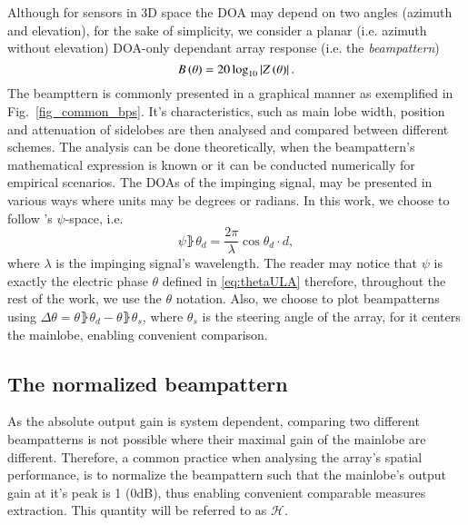 Although for sensors in 3D space the DOA may depend on two angles (azimuth and elevation), for the sake of simplicity, we consider a planar (i.e. azimuth without elevation) DOA-only dependant array response (i.e. the \emph{beampattern})
\begin{equation}
B\left({\theta}\right) = 20\log_{10}\left\vert Z\left({\theta}\right)\right\vert.
\end{equation}
The beampttern is commonly presented in a graphical manner as exemplified in Fig.~\ref{fig_common_bps}.
It's characteristics, such as main lobe width, position and attenuation of sidelobes are then analysed and compared between different schemes.
The analysis can be done theoretically, when the beampattern's mathematical expression is known or it can be conducted numerically for empirical scenarios.
The DOAs of the impinging signal, may be presented in various ways where units may be degrees or radians.
In this work, we choose to follow \cite{van2004optimum}'s $\psi$-space, i.e.
\begin{equation}
    \psi\rBrace{\theta_{d}}=\frac{2\pi}{\lambda}\cos{\theta_{d}}\cdot{}d,
\end{equation}
where $\lambda$ is the impinging signal's wavelength.
The reader may notice that $\psi$ is exactly the electric phase $\theta$ defined in \eqref{eq:thetaULA} therefore, throughout the rest of the work, we use the $\theta$ notation. 
Also, we choose to plot beampatterns using $\Delta\theta = \theta\rBrace{\theta_{d}} - \theta\rBrace{\theta_{s}}$, where $\theta_{s}$ is the steering angle of the array, for it centers the mainlobe, enabling convenient comparison.
\subsection{The normalized beampattern}
As the absolute output gain is system dependent, comparing two different beampatterns is not possible where their maximal gain of the mainlobe are different.
Therefore, a common practice \cite{van2004optimum} when analysing the array's spatial performance, is to normalize the beampattern such that the mainlobe's output gain at it's peak is 1 (0dB), thus enabling convenient comparable measures extraction.
This quantity will be referred to as $\mathcal{H}$.
